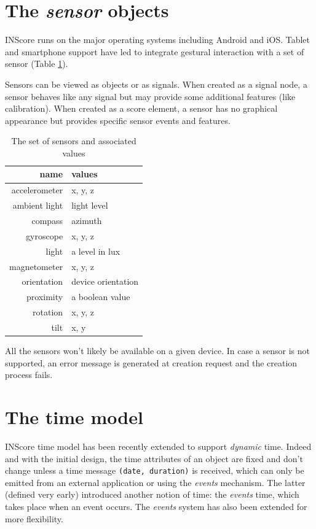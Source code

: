 \documentclass[11pt,a4paper]{article}
\newcommand{\OSC}[1]	{{\fontsize{10pt}{10pt} \selectfont\texttt{#1}}}
\begin{document}
\section{The \emph{sensor} objects}

INScore runs on the major operating systems including Android and iOS. Tablet and smartphone support have led to integrate gestural interaction with a set of sensor (Table \ref{tabsensors}). 

Sensors can be viewed as objects or as signals. When created as a signal node, a sensor behaves like any signal but may provide some additional features (like calibration). When created as a score element, a sensor has no graphical appearance but provides specific sensor events and features.

\begin{table}[ht]
\begin{center}
\begin{tabular}{rl}
\hline
name & values \\
\hline
accelerometer	& x, y, z \\
ambient light	& light level \\
compass			& azimuth \\
gyroscope		& x, y, z \\
light			& a level in lux \\
magnetometer	& x, y, z \\
orientation		& device orientation \\
proximity		& a boolean value \\
rotation		& x, y, z \\
tilt			& x, y \\
\hline
\end{tabular}
\end{center}
\caption{The set of sensors and associated values}
\label{tabsensors}
\end{table}

All the sensors won't likely be available on a given device. In case a sensor is not supported, an error message is generated at creation request and the creation process fails.



\section{The time model}

INScore time model has been recently extended to support \emph{dynamic} time. Indeed and with the initial design, the time attributes of an object are fixed and don't change unless a time message \OSC{(date, duration)} is received, which can only be emitted from an external application or using the \emph{events} mechanism. The latter (defined very early) introduced another notion of time: the \emph{events} time, which takes place when an event occurs.  The \emph{events} system has also been extended for more flexibility. 
\end{document}
